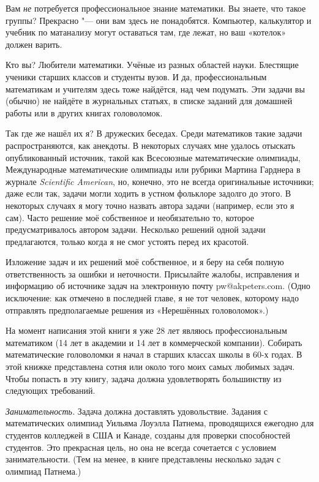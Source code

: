 \documentclass[twoside]{book}
\begin{document}
Вам \emph{не} потребуется профессиональное знание математики.
Вы знаете, что такое группы? Прекрасно "---  они вам здесь не понадобятся.
Компьютер, калькулятор и учебник по матанализу %
могут оставаться там, где лежат, но ваш «котелок» должен варить.

Кто вы? Любители математики.
Учёные из разных областей науки.
Блестящие ученики старших классов и студенты вузов.
И да, профессиональным математикам и учителям здесь тоже найдётся, над чем подумать.
Эти задачи вы (обычно) не найдёте в журнальных статьях, в списке заданий для домашней работы или в других книгах головоломок.

Так где же нашёл их я? В дружеских беседах.
Среди математиков такие задачи распространяются, как анекдоты.
В некоторых случаях мне удалось отыскать опубликованный источник, такой как Всесоюзные математические олимпиады, Международные математические олимпиады или рубрики Мартина Гарднера в журнале \emph{Scientific American}, но, конечно, это не всегда оригинальные источники;
даже если так, задачи могли ходить в устном фольклоре задолго до этого.
В некоторых случаях я могу точно назвать автора задачи (например, если это я сам).
Часто решение моё собственное и необязательно то, которое предусматривалось автором задачи.
Несколько решений одной задачи предлагаются, только когда я не смог устоять перед их красотой.

Изложение задач и их решений моё собственное, и я беру на себя полную ответственность за ошибки и неточности.
Присылайте жалобы, исправления и информацию об источнике задач на электронную почту pw@akpeters.com.
(Одно исключение: как отмечено в последней главе, я не тот человек, которому надо отправлять предполагаемые решения из «Нерешённых головоломок».)

На момент написания этой книги я уже 28 лет являюсь профессиональным математиком
(14 лет в академии и 14 лет в коммерческой компании).
Собирать математические головоломки я начал в старших классах школы в 60-х годах.
В этой книжке представлена сотня или около того моих самых любимых задач.
Чтобы попасть в эту книгу, задача должна удовлетворять большинству из следующих требований.

\textit{Занимательность.}
Задача должна доставлять удовольствие.
Задания с математических олимпиад Уильяма Лоуэлла Патнема, проводящихся ежегодно для студентов колледжей в США и Канаде, созданы для проверки способностей студентов.
Это прекрасная цель, но она не всегда сочетается с условием занимательности.
(Тем на менее, в книге представлены несколько задач с олимпиад Патнема.)
\end{document}
